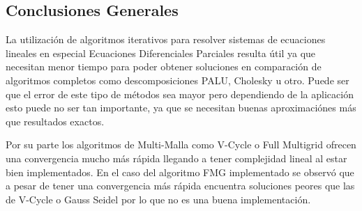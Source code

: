 \documentclass[letter, 10pt]{article}
\begin{document}
\subsection{Conclusiones Generales}

La utilización de algoritmos iterativos para resolver sistemas de ecuaciones lineales en especial Ecuaciones Diferenciales Parciales resulta útil ya que necesitan menor tiempo para poder obtener soluciones en comparación de algoritmos completos como descomposiciones PALU, Cholesky u otro. Puede ser que el error de este tipo de métodos sea mayor pero dependiendo de la aplicación esto puede no ser tan importante, ya que se necesitan buenas aproximaciónes más que resultados exactos.

Por su parte los algoritmos de Multi-Malla como V-Cycle o Full Multigrid ofrecen una convergencia mucho más rápida llegando a tener complejidad lineal al estar bien implementados. En el caso del algoritmo FMG implementado se observó que a pesar de tener una convergencia más rápida encuentra soluciones peores que las de V-Cycle o Gauss Seidel por lo que no es una buena implementación. 



\end{document}
